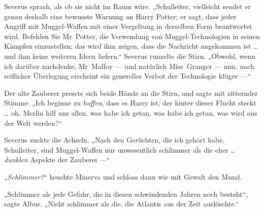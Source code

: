 Severus sprach, als ob sie nicht im Raum wäre.
„Schulleiter, vielleicht sendet er genau deshalb eine bewusste Warnung an Harry Potter; er sagt, dass jeder Angriff mit Muggel-Waffen mit einer Vergeltung in derselben Form beantwortet wird. Befehlen Sie Mr~Potter, die Verwendung von Muggel-Technologien in seinen Kämpfen einzustellen; das wird ihm zeigen, dass die Nachricht angekommen ist … und ihm keine weiteren Ideen liefern.“ Severus runzelte die Stirn.
„Obwohl, wenn ich darüber nachdenke, Mr~Malfoy — und natürlich Miss~Granger — nun, nach reiflicher Überlegung erscheint ein generelles Verbot der Technologie klüger —“

Der alte Zauberer presste sich beide Hände an die Stirn, und sagte mit zitternder Stimme:
„Ich beginne zu \emph{hoffen}, dass es Harry ist, der hinter dieser Flucht steckt … oh, Merlin hilf uns allen, was habe ich getan, was habe ich getan, was wird aus der Welt werden?“

Severus zuckte die Achseln.
„Nach den Gerüchten, die ich gehört habe, Schulleiter, sind Muggel-Waffen nur unwesentlich schlimmer als die eher … \emph{dunklen} Aspekte der Zauberei —“

„\emph{Schlimmer?}“ keuchte Minerva und schloss dann wie mit Gewalt den Mund.

„Schlimmer als jede Gefahr, die in diesen schwindenden Jahren noch besteht“, sagte Albus.
„Nicht schlimmer als die, die Atlantis aus der Zeit auslöschte.“

